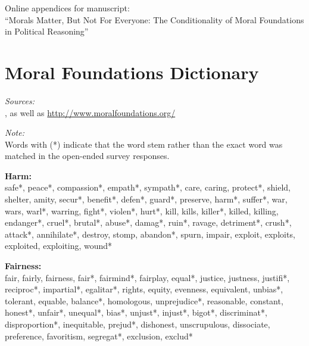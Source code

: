 \documentclass[12pt]{article}
\begin{document}
\clearpage\footnotesize\singlespacing
\appendices
\appendixpage
\renewcommand\thesubsection{\Roman{subsection}}
\begin{flushleft}
Online appendices for manuscript: \\
``Morals Matter, But Not For Everyone: The Conditionality of Moral Foundations in Political Reasoning''

\startcontents[sections]
\clearpage

\section{Moral Foundations Dictionary}\label{app:dict}
\renewcommand\thefigure{\thesection.\arabic{figure}}
\renewcommand\thetable{\thesection.\arabic{table}}
\setcounter{figure}{0}
\setcounter{table}{0}

\textit{Sources:}\\
\citet{graham2009liberals}, as well as \url{http://www.moralfoundations.org/}
\vspace{.5cm}

\textit{Note:}\\
Words with (*) indicate that the word stem rather than the exact word was matched in the open-ended survey responses.
\vspace{.5cm}

\textbf{Harm:}\\
safe*, peace*, compassion*, empath*, sympath*, care, caring, protect*, shield, shelter, amity, secur*, benefit*, defen*, guard*, preserve, harm*, suffer*, war, wars, warl*, warring, fight*, violen*, hurt*, kill, kills, killer*, killed, killing, endanger*, cruel*, brutal*, abuse*, damag*, ruin*, ravage, detriment*, crush*, attack*, annihilate*, destroy, stomp, abandon*, spurn, impair, exploit, exploits, exploited, exploiting, wound*
\vspace{.5cm}

\textbf{Fairness:}\\
fair, fairly, fairness, fair*, fairmind*, fairplay, equal*, justice, justness, justifi*, reciproc*, impartial*, egalitar*, rights, equity, evenness, equivalent, unbias*, tolerant, equable, balance*, homologous, unprejudice*, reasonable, constant, honest*, unfair*, unequal*, bias*, unjust*, injust*, bigot*, discriminat*, disproportion*, inequitable, prejud*, dishonest, unscrupulous, dissociate, preference, favoritism, segregat*, exclusion, exclud*
\vspace{.5cm}


\end{flushleft}
\end{document}

